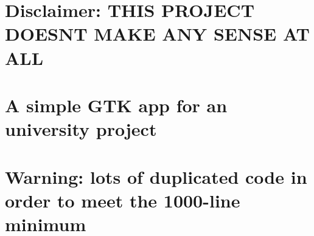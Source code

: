 \section*{Disclaimer\+: T\+H\+IS P\+R\+O\+J\+E\+CT D\+O\+E\+SN\textquotesingle{}T M\+A\+KE A\+NY S\+E\+N\+SE AT A\+LL}

\section*{A simple G\+TK app for an university project}

\section*{Warning\+: lots of duplicated code in order to meet the 1000-\/line minimum}
